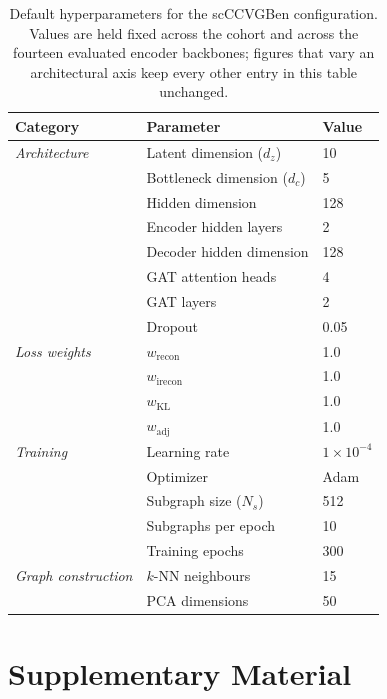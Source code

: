 \documentclass[referee, pdflatex, sn-vancouver-num]{sn-jnl}
\begin{document}
\begin{appendices}
\begin{table}[!htbp]
\centering
\caption{Default hyperparameters for the scCCVGBen configuration. Values are held fixed across the cohort and across the fourteen evaluated encoder backbones; figures that vary an architectural axis keep every other entry in this table unchanged.}%
\label{table_hyperparams}
\begin{tabular}{lll}
\toprule
\textbf{Category} & \textbf{Parameter} & \textbf{Value} \\
\midrule
\textit{Architecture} & Latent dimension ($d_z$) & 10 \\
& Bottleneck dimension ($d_c$) & 5 \\
& Hidden dimension & 128 \\
& Encoder hidden layers & 2 \\
& Decoder hidden dimension & 128 \\
& GAT attention heads & 4 \\
& GAT layers & 2 \\
& Dropout & 0.05 \\
\midrule
\textit{Loss weights} & $w_{\text{recon}}$ & 1.0 \\
& $w_{\text{irecon}}$ & 1.0 \\
& $w_{\text{KL}}$ & 1.0 \\
& $w_{\text{adj}}$ & 1.0 \\
\midrule
\textit{Training} & Learning rate & $1 \times 10^{-4}$ \\
& Optimizer & Adam \\
& Subgraph size ($N_s$) & 512 \\
& Subgraphs per epoch & 10 \\
& Training epochs & 300 \\
\midrule
\textit{Graph construction} & $k$-NN neighbours & 15 \\
& PCA dimensions & 50 \\
\bottomrule
\end{tabular}
\end{table}

\section{Supplementary Material}\label{app:supp}

\renewcommand{\thefigure}{S\arabic{figure}}
\renewcommand{\thetable}{S\arabic{table}}
\setcounter{figure}{0}
\setcounter{table}{0}


\end{appendices}
\end{document}

